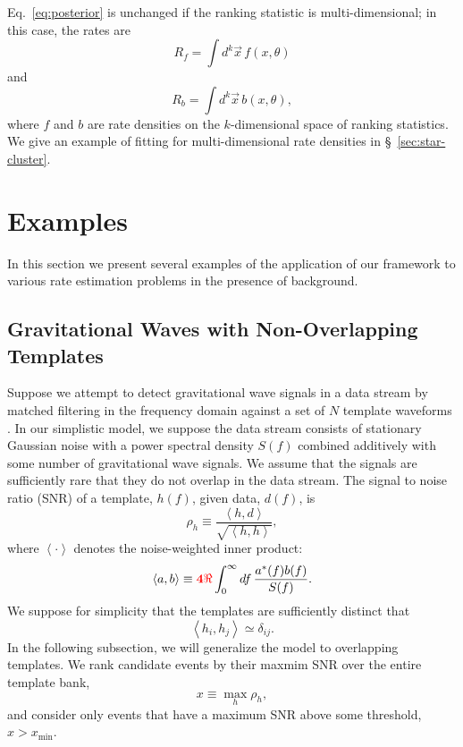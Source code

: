 \documentclass[aps,prd]{revtex4-1}
\newcommand{\xmin}{x_\mathrm{min}}
\newcommand{\ilya}[1]{{\color{red} \bf #1}}
\begin{document}
Eq.~\eqref{eq:posterior} is unchanged if the ranking statistic is
multi-dimensional; in this case, the rates are 
\begin{equation}
  R_f = \int d^k \vec{x} \, f(x, \theta)
\end{equation}
and
\begin{equation}
  R_b = \int d^k \vec{x} \, b(x, \theta),  
\end{equation}
where $f$ and $b$ are rate densities on the $k$-dimensional
space of ranking statistics.  We give an example of fitting for
multi-dimensional rate densities in \S~\ref{sec:star-cluster}.

\section{Examples}
\label{sec:GW-example}

In this section we present several examples of the application of our
framework to various rate estimation problems in the presence of
background.

\subsection{Gravitational Waves with Non-Overlapping Templates}
\label{sec:analytic-GW-example}

Suppose we attempt to detect gravitational wave signals in a data
stream by matched filtering in the frequency domain against a set of
$N$ template waveforms \citep[e.g.,][]{findchirppaper,LVC2011}.  In our simplistic
model, we suppose the data stream consists of stationary Gaussian
noise with a power spectral density $S(f)$ combined additively with
some number of gravitational wave signals.  We assume that the signals
are sufficiently rare that they do not overlap in the data stream.
The signal to noise ratio (SNR) of a template, $h(f)$, given data,
$d(f)$, is
\begin{equation}
  \rho_h \equiv \frac{\left\langle h, d \right\rangle}{\sqrt{\left
        \langle h, h \right\rangle}},
\end{equation}
where $\left \langle \cdot \right\rangle$ denotes the noise-weighted
inner product:
\begin{equation}
  \left\langle a, b \right\rangle \equiv \ilya{4 \Re} \int_0^\infty df\,
  \frac{a^*(f) b(f)}{S(f)}.
\end{equation}
We suppose for simplicity that the templates are sufficiently distinct
that 
\begin{equation}
  \left\langle h_i, h_j \right\rangle \simeq \delta_{ij}.
\end{equation}
In the following subsection, we will generalize the model to
overlapping templates.  We rank candidate events by their maxmim SNR
over the entire template bank,
\begin{equation}
  x \equiv \max_{h} \rho_h,
\end{equation}
and consider only events that have a maximum SNR above some threshold,
$x > \xmin$.
\end{document}

